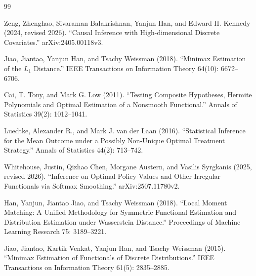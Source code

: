 \documentclass{article}
\begin{document}
\begin{thebibliography}{99}

   Zeng, Zhenghao, Sivaraman Balakrishnan, Yanjun Han, and Edward H. Kennedy (2024, revised 2026). ``Causal Inference with High-dimensional Discrete Covariates.'' arXiv:2405.00118v3.

   Jiao, Jiantao, Yanjun Han, and Tsachy Weissman (2018). ``Minimax Estimation of the \(L_1\) Distance.'' IEEE Transactions on Information Theory 64(10): 6672--6706.

   Cai, T. Tony, and Mark G. Low (2011). ``Testing Composite Hypotheses, Hermite Polynomials and Optimal Estimation of a Nonsmooth Functional.'' Annals of Statistics 39(2): 1012--1041.

   Luedtke, Alexander R., and Mark J. van der Laan (2016). ``Statistical Inference for the Mean Outcome under a Possibly Non-Unique Optimal Treatment Strategy.'' Annals of Statistics 44(2): 713--742.

   Whitehouse, Justin, Qizhao Chen, Morgane Austern, and Vasilis Syrgkanis (2025, revised 2026). ``Inference on Optimal Policy Values and Other Irregular Functionals via Softmax Smoothing.'' arXiv:2507.11780v2.

   Han, Yanjun, Jiantao Jiao, and Tsachy Weissman (2018). ``Local Moment Matching: A Unified Methodology for Symmetric Functional Estimation and Distribution Estimation under Wasserstein Distance.'' Proceedings of Machine Learning Research 75: 3189--3221.

   Jiao, Jiantao, Kartik Venkat, Yanjun Han, and Tsachy Weissman (2015). ``Minimax Estimation of Functionals of Discrete Distributions.'' IEEE Transactions on Information Theory 61(5): 2835--2885.

\end{thebibliography}
\end{document}
